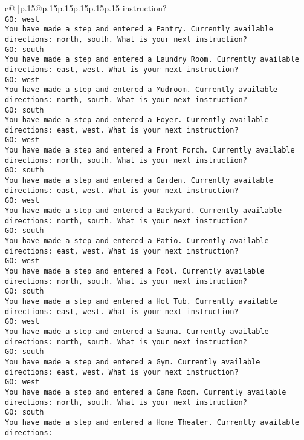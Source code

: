 \documentclass{article}
\begin{document}
{\begin{supertabular}{c@{$\;$}|p{.15\linewidth}@{}p{.15\linewidth}p{.15\linewidth}p{.15\linewidth}p{.15\linewidth}p{.15\linewidth}}
{{{instruction?\\ \tt GO: west\\ \tt You have made a step and entered a Pantry. Currently available directions: north, south. What is your next instruction?\\ \tt GO: south\\ \tt You have made a step and entered a Laundry Room. Currently available directions: east, west. What is your next instruction?\\ \tt GO: west\\ \tt You have made a step and entered a Mudroom. Currently available directions: north, south. What is your next instruction?\\ \tt GO: south\\ \tt You have made a step and entered a Foyer. Currently available directions: east, west. What is your next instruction?\\ \tt GO: west\\ \tt You have made a step and entered a Front Porch. Currently available directions: north, south. What is your next instruction?\\ \tt GO: south\\ \tt You have made a step and entered a Garden. Currently available directions: east, west. What is your next instruction?\\ \tt GO: west\\ \tt You have made a step and entered a Backyard. Currently available directions: north, south. What is your next instruction?\\ \tt GO: south\\ \tt You have made a step and entered a Patio. Currently available directions: east, west. What is your next instruction?\\ \tt GO: west\\ \tt You have made a step and entered a Pool. Currently available directions: north, south. What is your next instruction?\\ \tt GO: south\\ \tt You have made a step and entered a Hot Tub. Currently available directions: east, west. What is your next instruction?\\ \tt GO: west\\ \tt You have made a step and entered a Sauna. Currently available directions: north, south. What is your next instruction?\\ \tt GO: south\\ \tt You have made a step and entered a Gym. Currently available directions: east, west. What is your next instruction?\\ \tt GO: west\\ \tt You have made a step and entered a Game Room. Currently available directions: north, south. What is your next instruction?\\ \tt GO: south\\ \tt You have made a step and entered a Home Theater. Currently available directions: }}}
\end{supertabular}}
\end{document}
